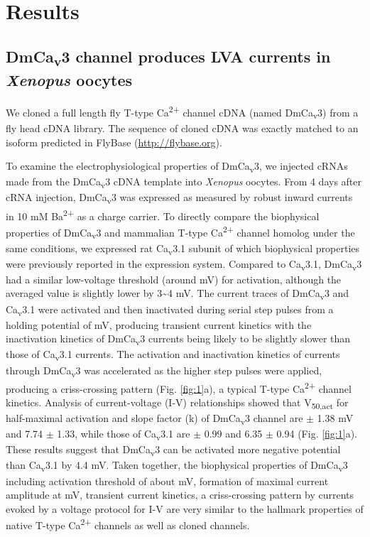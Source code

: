 \section*{Results}

\subsection*{DmCa\textsubscript{v}3 channel produces LVA currents in \emph{Xenopus} oocytes}

We cloned a full length fly T-type Ca\textsuperscript{2+} channel cDNA (named DmCa\textsubscript{v}3) from a fly head cDNA library. 
The sequence of cloned cDNA was exactly matched to an isoform predicted in FlyBase (\href{http://}{http://flybase.org}). 

To examine the electrophysiological properties of DmCa\textsubscript{v}3, we injected cRNAs made from the DmCa\textsubscript{v}3 cDNA template into \emph{Xenopus} oocytes.
From 4 days after cRNA injection, DmCa\textsubscript{v}3 was expressed as measured by robust inward currents in 10 mM Ba\textsuperscript{2+} as a charge carrier.
To directly compare the biophysical properties of DmCa\textsubscript{v}3 and mammalian T-type Ca\textsuperscript{2+} channel homolog under the same conditions, we expressed rat Ca\textsubscript{v}3.1 subunit of which biophysical properties were previously reported in the expression system\cite{9495342}.
Compared to Ca\textsubscript{v}3.1, DmCa\textsubscript{v}3 had a similar low-voltage threshold (around  mV) for activation, although the averaged value is slightly lower by 3\sim 4 mV.
The current traces of DmCa\textsubscript{v}3 and Ca\textsubscript{v}3.1 were activated and then inactivated during serial step pulses from a holding potential of  mV, producing transient current kinetics with the inactivation kinetics of DmCa\textsubscript{v}3 currents being likely to be slightly slower than those of Ca\textsubscript{v}3.1 currents.
The activation and inactivation kinetics of currents through DmCa\textsubscript{v}3 was accelerated as the higher step pulses were applied, producing a criss-crossing pattern (Fig. \ref{fig:1}a), a typical T-type Ca\textsuperscript{2+} channel kinetics.
Analysis of current-voltage (I-V) relationships showed that V\textsubscript{50,act} for half-maximal activation and slope factor (k) of DmCa\textsubscript{v}3 channel are  $\pm$ 1.38 mV and 7.74 $\pm$ 1.33, while those of Ca\textsubscript{v}3.1 are  $\pm$ 0.99 and 6.35 $\pm$ 0.94 (Fig. \ref{fig:1}a).
These results suggest that DmCa\textsubscript{v}3 can be activated more negative potential than Ca\textsubscript{v}3.1 by 4.4 mV.
Taken together, the biophysical properties of DmCa\textsubscript{v}3 including activation threshold of about  mV, formation of maximal current amplitude at  mV, transient current kinetics, a criss-crossing pattern by currents evoked by a voltage protocol for I-V are very similar to the hallmark properties of native T-type Ca\textsuperscript{2+} channels as well as cloned channels\cite{9495342, 6087159, 9670923, 10066244}.

